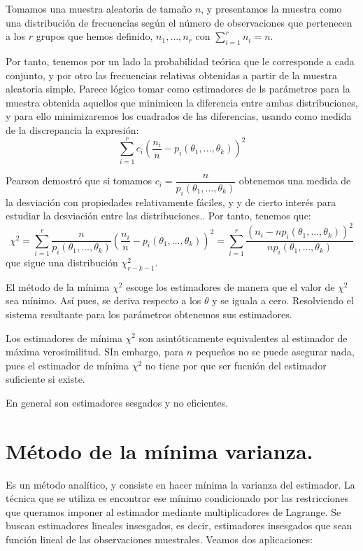 Tomamos una muestra aleatoria de tama\~no $n$, y presentamos la muestra como una distribuci\'on de frecuencias seg\'un el n\'umero de observaciones que pertenecen a los $r$ grupos que hemos definido, $n_1,\ldots,n_r$ con $\sum_{i=1}^rn_i=n$.

Por tanto, tenemos por un lado la probabilidad te\'orica que le corresponde a cada conjunto, y por otro las frecuencias relativas obtenidas a partir de la muestra aleatoria simple. Parece l\'ogico tomar como estimadores de ls par\'ametros para la muestra obtenida aquellos que minimicen la diferencia entre ambas distribuciones, y para ello minimizaremos los cuadrados de las diferencias, usando como medida de la discrepancia la expresi\'on:
\begin{equation*}
\sum_{i=1}^rc_i\left(\dfrac{n_i}{n}-p_i(\theta_1,\ldots,\theta_k)\right)^2
\end{equation*}

Pearson demostr\'o que si tomamos $c_i=\dfrac{n}{p_i(\theta_1,\ldots,\theta_k)}$ obtenemos una medida de la desviaci\'on con propiedades relativamente f\'aciles, y y de cierto inter\'es para estudiar la desviaci\'on entre las distribuciones.. Por tanto, tenemos que:
\begin{equation*}
\chi^2=\sum_{i=1}^r\dfrac{n}{p_i(\theta_1,\ldots,\theta_k)}\left(\dfrac{n_i}{n}-p_i(\theta_1,\ldots,\theta_k)\right)^2=\sum_{i=1}^r\dfrac{\left(n_i-np_i(\theta_1,\ldots,\theta_k)\right)^2}{np_i(\theta_1,\ldots,\theta_k)}
\end{equation*}
que sigue una distribuci\'on $\chi_{r-k-1}^2$.

El m\'etodo de la m\'inima $\chi^2$ escoge los estimadores de manera que el valor de $\chi^2$ sea m\'inimo. As\'i pues, se deriva respecto a los $\theta$ y se iguala a cero. Resolviendo el sistema resultante para los par\'ametros obtenemos sus estimadores.

Los estimadores de m\'inima $\chi^2$ son asint\'oticamente equivalentes al estimador de m\'axima verosimilitud. SIn embargo, para $n$ peque\~nos no se puede asegurar nada, pues el estimador de m\'inima $\chi^2$ no tiene por que ser fucni\'on del estimador suficiente si existe.

En general son estimadores sesgados y no eficientes.
\section{M\'etodo de la m\'inima varianza.}

Es un m\'etodo anal\'itico, y consiste en hacer m\'inima la varianza del estimador. La t\'ecnica que se utiliza es encontrar ese m\'inimo condicionado por las restricciones que queramos imponer al estimador mediante multiplicadores de Lagrange. Se buscan estimadores lineales insesgados, es decir, estimadores insesgados que sean funci\'on lineal de las observaciones muestrales. Veamos dos aplicaciones:


